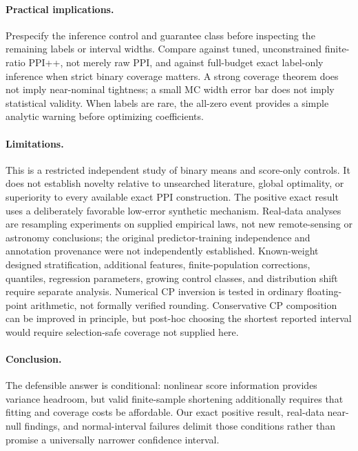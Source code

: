 \documentclass{article}
\begin{document}
\paragraph{Practical implications.}
Prespecify the inference control and guarantee class before inspecting the remaining labels or interval widths. Compare against tuned, unconstrained finite-ratio PPI++, not merely raw PPI, and against full-budget exact label-only inference when strict binary coverage matters. A strong coverage theorem does not imply near-nominal tightness; a small MC width error bar does not imply statistical validity. When labels are rare, the all-zero event provides a simple analytic warning before optimizing coefficients.

\paragraph{Limitations.}
This is a restricted independent study of binary means and score-only controls. It does not establish novelty relative to unsearched literature, global optimality, or superiority to every available exact PPI construction. The positive exact result uses a deliberately favorable low-error synthetic mechanism. Real-data analyses are resampling experiments on supplied empirical laws, not new remote-sensing or astronomy conclusions; the original predictor-training independence and annotation provenance were not independently established. Known-weight designed stratification, additional features, finite-population corrections, quantiles, regression parameters, growing control classes, and distribution shift require separate analysis. Numerical CP inversion is tested in ordinary floating-point arithmetic, not formally verified rounding. Conservative CP composition can be improved in principle, but post-hoc choosing the shortest reported interval would require selection-safe coverage not supplied here.

\paragraph{Conclusion.}
The defensible answer is conditional: nonlinear score information provides variance headroom, but valid finite-sample shortening additionally requires that fitting and coverage costs be affordable. Our exact positive result, real-data near-null findings, and normal-interval failures delimit those conditions rather than promise a universally narrower confidence interval.
\end{document}
